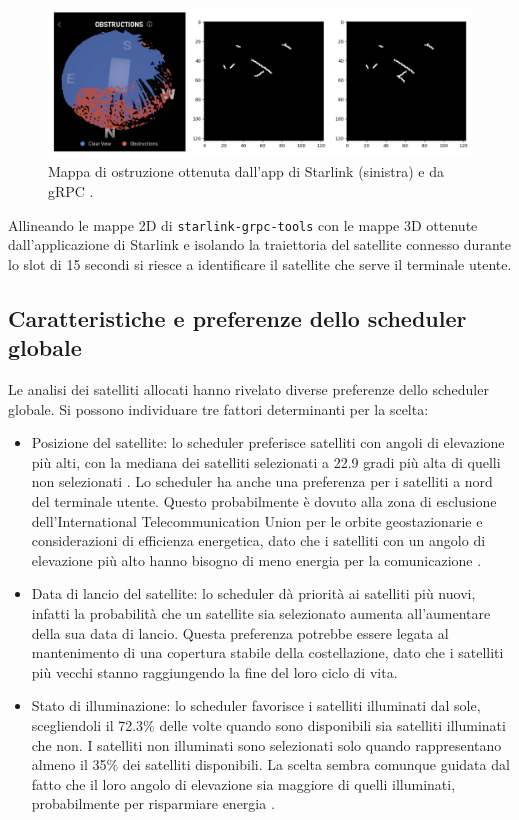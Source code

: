 \begin{figure}[htbp]
  \centering
  \includegraphics[width=0.7\linewidth]{./res/img/obstruction_maps.png}
  \caption{Mappa di ostruzione ottenuta dall'app di Starlink (sinistra) e da gRPC \cite{sparky8512_starlink-grpc-tools_nodate}\cite{tanveer_making_2023}.}
  \label{fig:obstruction-maps}
\end{figure}

Allineando le mappe 2D di \verb|starlink-grpc-tools| con le mappe 3D ottenute dall'applicazione di Starlink e isolando la traiettoria del satellite connesso durante lo slot di 15 secondi si riesce a identificare il satellite che serve il terminale utente.

\subsection{Caratteristiche e preferenze dello scheduler globale}
Le analisi dei satelliti allocati hanno rivelato diverse preferenze dello scheduler globale. Si possono individuare tre fattori determinanti per la scelta:
\begin{itemize}
  \item Posizione del satellite: lo scheduler preferisce satelliti con angoli di elevazione più alti, con la mediana dei satelliti selezionati a 22.9 gradi più alta di quelli non selezionati \cite{tanveer_making_2023}.
  Lo scheduler ha anche una preferenza per i satelliti a nord del terminale utente. Questo probabilmente è dovuto alla zona di esclusione dell'International Telecommunication Union per le orbite geostazionarie e considerazioni di efficienza energetica, dato che i satelliti con un angolo di elevazione più alto hanno bisogno di meno energia per la comunicazione \cite{tanveer_making_2023}.
  \item Data di lancio del satellite: lo scheduler dà priorità ai satelliti più nuovi, infatti la probabilità che un satellite sia selezionato aumenta all'aumentare della sua data di lancio. Questa preferenza potrebbe essere legata al mantenimento di una copertura stabile della costellazione, dato che i satelliti più vecchi stanno raggiungendo la fine del loro ciclo di vita.
  \item Stato di illuminazione: lo scheduler favorisce i satelliti illuminati dal sole, scegliendoli il 72.3\% delle volte quando sono disponibili sia satelliti illuminati che non. I satelliti non illuminati sono selezionati solo quando rappresentano almeno il 35\% dei satelliti disponibili. La scelta sembra comunque guidata dal fatto che il loro angolo di elevazione sia maggiore di quelli illuminati, probabilmente per risparmiare energia \cite{tanveer_making_2023}.
\end{itemize}

